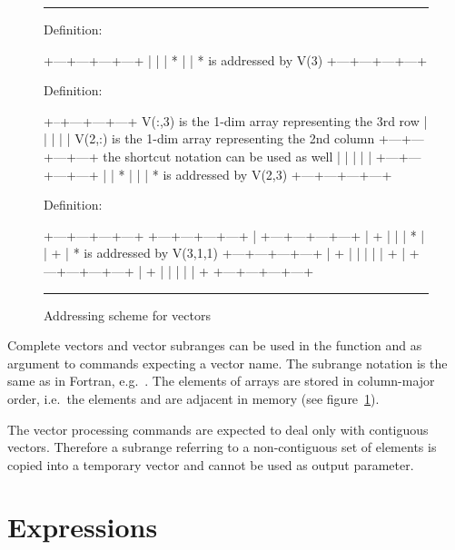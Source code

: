 \begin{figure}[htb]
\hrule
\vspace{\baselineskip}
Definition: 
\begin{XMP} 
+---+---+---+---+
|   |   | * |   |   * {\rm is addressed by} V(3)
+---+---+---+---+
\end{XMP} 

Definition: 
\begin{XMP} 
+--+---+---+---+               V(:,3) {\rm is the 1-dim array representing the 3rd row}
|   |   |   |   |               V(2,:) {\rm is the 1-dim array representing the 2nd column}
+---+---+---+---+                      {\rm the shortcut notation  can be used as well}
|   |   |   |   |
+---+---+---+---+
|   | * |   |   |   * {\rm is addressed by} V(2,3)
+---+---+---+---+
\end{XMP} 

Definition: 
\begin{XMP} 
    +---+---+---+---+
  +---+---+---+---+ |
+---+---+---+---+ | +
|   |   | * |   | + |   * {\rm is addressed by} V(3,1,1)
+---+---+---+---+ | +
|   |   |   |   | + |
+---+---+---+---+ | +
|   |   |   |   | +
+---+---+---+---+  
\vspace{-1cm}
\end{XMP}
\caption{Addressing scheme for \KUIP{} vectors
\label{fig-vector-addressing}}
\hrule
\end{figure}

Complete vectors and vector subranges can be used in the 
function and as argument to commands expecting a vector name.
The subrange notation is the same as in Fortran, e.g.\ .
The elements of arrays are stored in column-major order, i.e.\ the
elements  and  are adjacent in memory
(see figure~\ref{fig-vector-addressing}).

The vector processing commands are expected to deal only with
contiguous vectors.
Therefore a subrange referring to a non-contiguous set of elements is copied
into a temporary vector and cannot be used as output parameter.

\fi%

\section{Expressions\label{sec-expressions}}

